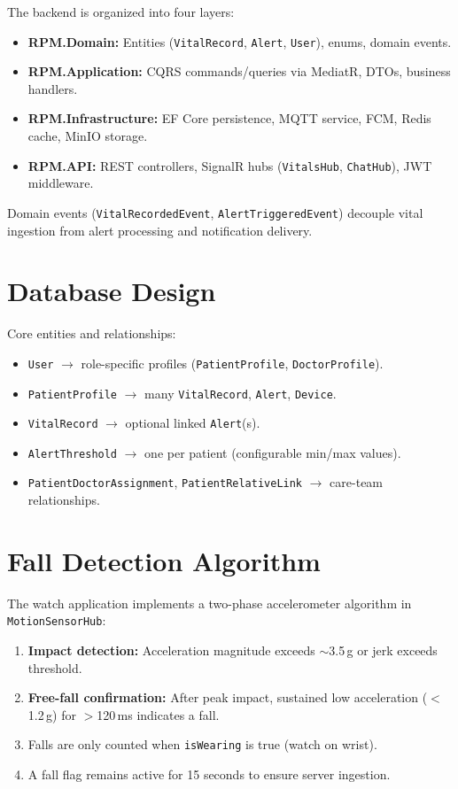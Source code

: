 \documentclass[12pt,a4paper]{report}
\begin{document}
The backend is organized into four layers:

\begin{itemize}[leftmargin=*]
  \item \textbf{RPM.Domain:} Entities (\texttt{VitalRecord}, \texttt{Alert}, \texttt{User}), enums, domain events.
  \item \textbf{RPM.Application:} CQRS commands/queries via MediatR, DTOs, business handlers.
  \item \textbf{RPM.Infrastructure:} EF Core persistence, MQTT service, FCM, Redis cache, MinIO storage.
  \item \textbf{RPM.API:} REST controllers, SignalR hubs (\texttt{VitalsHub}, \texttt{ChatHub}), JWT middleware.
\end{itemize}

Domain events (\texttt{VitalRecordedEvent}, \texttt{AlertTriggeredEvent}) decouple vital ingestion from alert processing and notification delivery.

\section{Database Design}

Core entities and relationships:

\begin{itemize}[leftmargin=*]
  \item \texttt{User} $\rightarrow$ role-specific profiles (\texttt{PatientProfile}, \texttt{DoctorProfile}).
  \item \texttt{PatientProfile} $\rightarrow$ many \texttt{VitalRecord}, \texttt{Alert}, \texttt{Device}.
  \item \texttt{VitalRecord} $\rightarrow$ optional linked \texttt{Alert}(s).
  \item \texttt{AlertThreshold} $\rightarrow$ one per patient (configurable min/max values).
  \item \texttt{PatientDoctorAssignment}, \texttt{PatientRelativeLink} $\rightarrow$ care-team relationships.
\end{itemize}

\section{Fall Detection Algorithm}

The watch application implements a two-phase accelerometer algorithm in \texttt{MotionSensorHub}:

\begin{enumerate}[leftmargin=*]
  \item \textbf{Impact detection:} Acceleration magnitude exceeds $\sim$3.5\,g or jerk exceeds threshold.
  \item \textbf{Free-fall confirmation:} After peak impact, sustained low acceleration ($<$1.2\,g) for $>$120\,ms indicates a fall.
  \item Falls are only counted when \texttt{isWearing} is true (watch on wrist).
  \item A fall flag remains active for 15 seconds to ensure server ingestion.
\end{enumerate}
\end{document}
